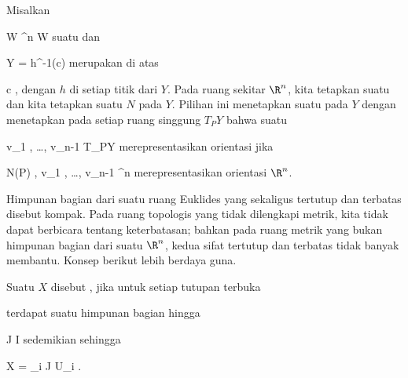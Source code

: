 {}
{

Misalkan

\mavergleichskette
{\vergleichskette
{ W
}
{ \subseteq }{ \R^n
}
{  }{
}
{    }{
}
{   }{
}
}
{}{}{}
 { W } { \R
} {}
suatu
dan

\mavergleichskette
{\vergleichskette
{ Y
}
{ = }{ h^{-1}(c)
}
{  }{
}
{    }{
}
{   }{
}
}
{}{}{}
merupakan
di atas

\mavergleichskette
{\vergleichskette
{ c
}
{ \in }{ \R
}
{  }{
}
{    }{
}
{   }{
}
}
{}{}{,}
dengan $h$
di setiap titik dari $Y$. Pada ruang sekitar $\R^n$, kita tetapkan suatu
 {} {}
dan kita tetapkan suatu
$N$ pada $Y$. Pilihan ini menetapkan suatu
pada $Y$
 {} {}
dengan menetapkan pada setiap ruang singgung $T_PY$ bahwa suatu

\mavergleichskette
{\vergleichskette
{ v_1 , \ldots , v_{n-1}
}
{ \in }{ T_PY
}
{  }{
}
{    }{
}
{   }{
}
}
{}{}{}
merepresentasikan orientasi jika

\mavergleichskette
{\vergleichskette
{ N(P) , v_1 , \ldots , v_{n-1}
}
{ \in }{ \R^n
}
{  }{
}
{    }{
}
{   }{
}
}
{}{}{}
merepresentasikan orientasi $\R^n$.

}


Himpunan bagian dari suatu ruang Euklides yang sekaligus tertutup dan terbatas disebut kompak. Pada ruang topologis yang tidak dilengkapi metrik, kita tidak dapat berbicara tentang keterbatasan; bahkan pada ruang metrik yang bukan himpunan bagian dari suatu $\R^n$, kedua sifat tertutup dan terbatas tidak banyak membantu. Konsep berikut lebih berdaya guna.

{}
{

Suatu
$X$ disebut 
 {} {,}
jika untuk setiap tutupan terbuka

 {  }

terdapat suatu himpunan bagian hingga

\mavergleichskette
{\vergleichskette
{J
}
{ \subseteq }{ I
}
{  }{
}
{    }{
}
{   }{
}
}
{}{}{}
sedemikian sehingga

\mavergleichskettedisp
{\vergleichskette
{ X
}
{ =} { \bigcup_{i \in J} U_i
}
{ } {
}
{ } {
}
{ } {
}
}
{}{}{}
.

}

